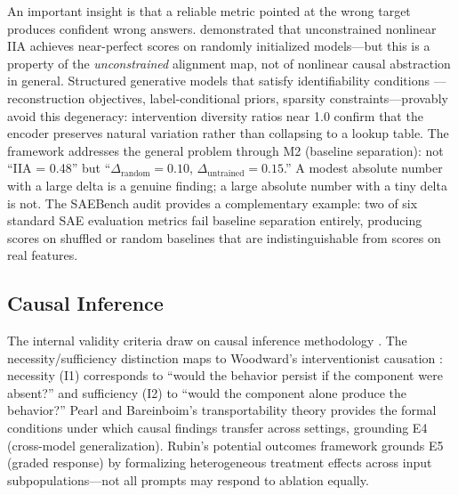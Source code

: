 \documentclass{article}
\begin{document}
An important insight is that a reliable metric pointed at the wrong target produces confident wrong answers. \citet{sutter2025nonlinear} demonstrated that unconstrained nonlinear IIA achieves near-perfect scores on randomly initialized models---but this is a property of the \emph{unconstrained} alignment map, not of nonlinear causal abstraction in general. Structured generative models that satisfy identifiability conditions \citep{khemakhem2020variational}---reconstruction objectives, label-conditional priors, sparsity constraints---provably avoid this degeneracy: intervention diversity ratios near 1.0 confirm that the encoder preserves natural variation rather than collapsing to a lookup table. The framework addresses the general problem through M2 (baseline separation): not ``IIA = 0.48'' but ``$\Delta_{\text{random}} = 0.10$, $\Delta_{\text{untrained}} = 0.15$.'' A modest absolute number with a large delta is a genuine finding; a large absolute number with a tiny delta is not. The SAEBench audit \citep{karvonen2025saebench} provides a complementary example: two of six standard SAE evaluation metrics fail baseline separation entirely, producing scores on shuffled or random baselines that are indistinguishable from scores on real features.


\subsection{Causal Inference}
\label{sec:causal}

The internal validity criteria draw on causal inference methodology \citep{pearl2009causality, spirtes2000causation}. The necessity/sufficiency distinction maps to Woodward's interventionist causation \citep{woodward2003making}: necessity (I1) corresponds to ``would the behavior persist if the component were absent?'' and sufficiency (I2) to ``would the component alone produce the behavior?'' Pearl and Bareinboim's transportability theory \citep{pearl2011transportability} provides the formal conditions under which causal findings transfer across settings, grounding E4 (cross-model generalization). Rubin's potential outcomes framework grounds E5 (graded response) by formalizing heterogeneous treatment effects across input subpopulations---not all prompts may respond to ablation equally.
\end{document}
